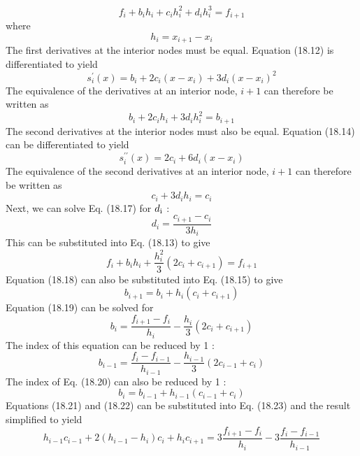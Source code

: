 \documentclass[../main.tex]{subfiles}
\begin{document}
\begin{equation}
    \tag{18.13}
f_{i}+b_{i} h_{i}+c_{i} h_{i}^{2}+d_{i} h_{i}^{3}=f_{i+1}
\end{equation}
where
\begin{equation}
h_{i}=x_{i+1}-x_{i} \nonumber
\end{equation}
The first derivatives at the interior nodes must be equal. Equation (18.12) is differentiated to yield
\begin{equation}
    \tag{18.14}
s_{i}^{\prime}(x)=b_{i}+2 c_{i}\left(x-x_{i}\right)+3 d_{i}\left(x-x_{i}\right)^{2}
\end{equation}
The equivalence of the derivatives at an interior node, $i+1$ can therefore be written as
\begin{equation}
    \tag{18.15}
b_{i}+2 c_{i} h_{i}+3 d_{i} h_{i}^{2}=b_{i+1}
\end{equation}
The second derivatives at the interior nodes must also be equal. Equation (18.14) can be differentiated to yield
\begin{equation}
    \tag{18.16}
s_{i}^{\prime \prime}(x)=2 c_{i}+6 d_{i}\left(x-x_{i}\right)
\end{equation}
The equivalence of the second derivatives at an interior node, $i+1$ can therefore be written as
\begin{equation}
    \tag{18.17}
c_{i}+3 d_{i} h_{i}=c_{i}
\end{equation}
Next, we can solve Eq. (18.17) for $d\textsubscript{i}$ :
\begin{equation}
    \tag{18.18}
d_{i}=\frac{c_{i+1}-c_{i}}{3 h_{i}}
\end{equation}
This can be substituted into Eq. (18.13) to give
\begin{equation}
    \tag{18.19}
f_{i}+b_{i} h_{i}+\frac{h_{i}^{2}}{3}\left(2 c_{i}+c_{i+1}\right)=f_{i+1}
\end{equation}
Equation (18.18) can also be substituted into Eq. (18.15) to give
\begin{equation}
    \tag{18.20}
b_{i+1}=b_{i}+h_{i}\left(c_{i}+c_{i+1}\right)
\end{equation}
Equation (18.19) can be solved for
\begin{equation}
    \tag{18.21}
b_{i}=\frac{f_{i+1}-f_{i}}{h_{i}}-\frac{h_{i}}{3}\left(2 c_{i}+c_{i+1}\right)
\end{equation}
The index of this equation can be reduced by 1 :
\begin{equation}
    \tag{18.22}
b_{i-1}=\frac{f_{i}-f_{i-1}}{h_{i-1}}-\frac{h_{i-1}}{3}\left(2 c_{i-1}+c_{i}\right)
\end{equation}
The index of Eq. (18.20) can also be reduced by 1 :
\begin{equation}
    \tag{18.23}
b_{i}=b_{i-1}+h_{i-1}\left(c_{i-1}+c_{i}\right)
\end{equation}
Equations (18.21) and (18.22) can be substituted into Eq. (18.23) and the result simplified to yield
\begin{equation}
    \tag{18.24}
h_{i-1} c_{i-1}+2\left(h_{i-1}-h_{i}\right) c_{i}+h_{i} c_{i+1}=3 \frac{f_{i+1}-f_{i}}{h_{i}}-3 \frac{f_{i}-f_{i-1}}{h_{i-1}}
\end{equation}
\end{document}
